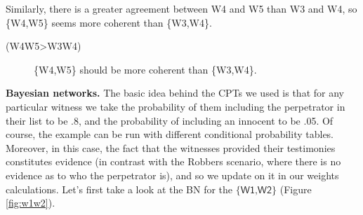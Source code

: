 \documentclass[
  10pt,
]{scrartcl}
\newcommand{\s}[1]{\textsf{#1}}
\begin{document}
Similarly, there is a greater agreement between \s{W4} and \s{W5} than \s{W3} and \s{W4}, so \{\s{W4},\s{W5}\} seems more coherent than \{\s{W3},\s{W4}\}.
\vspace{2mm}

\begin{description}
    \item[(\s{W4W5\textgreater W3W4})] \{\s{W4},\s{W5}\} should be more coherent than \{\s{W3},\s{W4}\}.
\end{description}\vspace{2mm}

\noindent \textbf{Bayesian networks.} The basic idea behind the CPTs we used is that for any particular witness we take the probability of them including the perpetrator in their list to be .8, and the probability of including an innocent to be .05. Of course, the example can be run with different conditional probability tables. Moreover, in this case, the fact that the witnesses provided their testimonies constitutes evidence (in contrast with the Robbers scenario, where there is no evidence as to who the perpetrator is), and so we update on it in our weights calculations. Let's first take a look at the BN for the \(\{\s{W1,W2}\}\) (Figure \ref{fig:w1w2}).

\vspace{1mm}
\footnotesize

\normalsize
\end{document}

